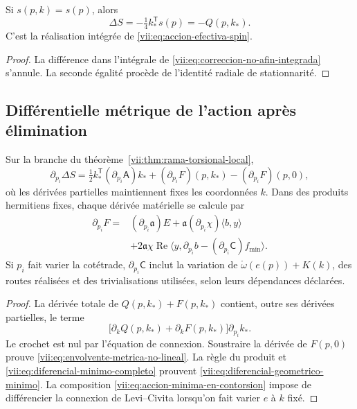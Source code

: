 \begin{corollary}
\label{vii:cor:recuperacion-eliminacion-afin}
Si \(s(p,k)=s(p)\), alors
\[
 \Delta S=-\tfrac14 k_*^{\mathsf T}s(p)=-Q(p,k_*).
\]
C'est la réalisation intégrée de \eqref{vii:eq:accion-efectiva-spin}.
\end{corollary}
\begin{proof}
La différence dans l'intégrale de
\eqref{vii:eq:correccion-no-afin-integrada} s'annule. La seconde
égalité procède de l'identité radiale de stationnarité.
\end{proof}

\subsection{Différentielle métrique de l'action après élimination}
\label{vii:subsec:diferencial-metrico-no-lineal}

\begin{theorem}
\label{vii:thm:envolvente-metrica}
Sur la branche du théorème~\ref{vii:thm:rama-torsional-local},
\begin{equation}
 \partial_{p_i}\Delta S
 =\tfrac12 k_*^{\mathsf T}(\partial_{p_i}\mathsf A)k_*
  +(\partial_{p_i}F)(p,k_*)-(\partial_{p_i}F)(p,0),
 \label{vii:eq:envolvente-metrica-no-lineal}
\end{equation}
où les dérivées partielles maintiennent fixes les coordonnées \(k\).
Dans des produits hermitiens fixes, chaque dérivée matérielle se calcule par
\begin{equation}
 \begin{split}
 \partial_{p_i}F={}&(\partial_{p_i}\mathfrak a)E
       +\mathfrak a(\partial_{p_i}\chi)\langle b,y\rangle\\
   &+2\mathfrak a\chi\operatorname{Re}
       \langle y,\partial_{p_i}b
                    -(\partial_{p_i}\mathsf C)f_{\min}\rangle.
 \end{split}
 \label{vii:eq:diferencial-geometrico-minimo}
\end{equation}
Si \(p_i\) fait varier la cotétrade, \(\partial_{p_i}\mathsf C\) inclut la variation de \(\mathring\omega(e(p))+K(k)\), des routes réalisées et des trivialisations utilisées, selon leurs dépendances déclarées.
\end{theorem}

\begin{proof}
La dérivée totale de \(Q(p,k_*)+F(p,k_*)\) contient, outre
ses dérivées partielles, le terme
\[
 \bigl[\partial_kQ(p,k_*)+\partial_kF(p,k_*)\bigr]
                      \partial_{p_i}k_*.
\]
Le crochet est nul par l'équation de connexion. Soustraire la dérivée
de \(F(p,0)\) prouve
\eqref{vii:eq:envolvente-metrica-no-lineal}.
La règle du produit et
\eqref{vii:eq:diferencial-minimo-completo} prouvent
\eqref{vii:eq:diferencial-geometrico-minimo}. La composition
\eqref{vii:eq:accion-minima-en-contorsion} impose de différencier
la connexion de Levi--Civita lorsqu'on fait varier \(e\) à \(k\) fixé.
\end{proof}

